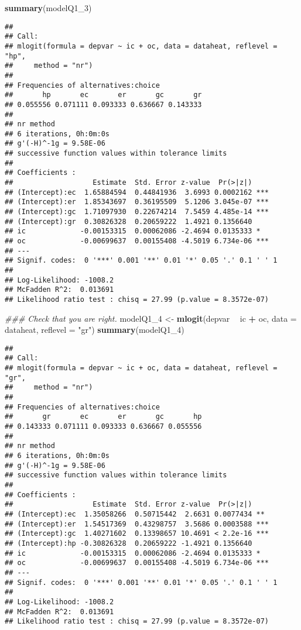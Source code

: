 \documentclass[
]{article}
\newenvironment{Shaded}{\begin{snugshade}}{\end{snugshade}}
\newcommand{\CommentTok}[1]{\textcolor[rgb]{0.56,0.35,0.01}{\textit{#1}}}
\newcommand{\DataTypeTok}[1]{\textcolor[rgb]{0.13,0.29,0.53}{#1}}
\newcommand{\DecValTok}[1]{\textcolor[rgb]{0.00,0.00,0.81}{#1}}
\newcommand{\KeywordTok}[1]{\textcolor[rgb]{0.13,0.29,0.53}{\textbf{#1}}}
\newcommand{\NormalTok}[1]{#1}
\newcommand{\OperatorTok}[1]{\textcolor[rgb]{0.81,0.36,0.00}{\textbf{#1}}}
\newcommand{\StringTok}[1]{\textcolor[rgb]{0.31,0.60,0.02}{#1}}
\begin{document}
\begin{Shaded}
\begin{Highlighting}[]
\KeywordTok{summary}\NormalTok{(modelQ1_}\DecValTok{3}\NormalTok{)}
\end{Highlighting}
\end{Shaded}

\begin{verbatim}
## 
## Call:
## mlogit(formula = depvar ~ ic + oc, data = dataheat, reflevel = "hp", 
##     method = "nr")
## 
## Frequencies of alternatives:choice
##       hp       ec       er       gc       gr 
## 0.055556 0.071111 0.093333 0.636667 0.143333 
## 
## nr method
## 6 iterations, 0h:0m:0s 
## g'(-H)^-1g = 9.58E-06 
## successive function values within tolerance limits 
## 
## Coefficients :
##                   Estimate  Std. Error z-value  Pr(>|z|)    
## (Intercept):ec  1.65884594  0.44841936  3.6993 0.0002162 ***
## (Intercept):er  1.85343697  0.36195509  5.1206 3.045e-07 ***
## (Intercept):gc  1.71097930  0.22674214  7.5459 4.485e-14 ***
## (Intercept):gr  0.30826328  0.20659222  1.4921 0.1356640    
## ic             -0.00153315  0.00062086 -2.4694 0.0135333 *  
## oc             -0.00699637  0.00155408 -4.5019 6.734e-06 ***
## ---
## Signif. codes:  0 '***' 0.001 '**' 0.01 '*' 0.05 '.' 0.1 ' ' 1
## 
## Log-Likelihood: -1008.2
## McFadden R^2:  0.013691 
## Likelihood ratio test : chisq = 27.99 (p.value = 8.3572e-07)
\end{verbatim}

\begin{Shaded}
\begin{Highlighting}[]
\CommentTok{### Check that you are right.}
\NormalTok{modelQ1_}\DecValTok{4}\NormalTok{ <-}\StringTok{ }\KeywordTok{mlogit}\NormalTok{(depvar }\OperatorTok{~}\StringTok{ }\NormalTok{ic }\OperatorTok{+}\StringTok{ }\NormalTok{oc, }\DataTypeTok{data =}\NormalTok{ dataheat, }\DataTypeTok{reflevel =} \StringTok{"gr"}\NormalTok{)}
\KeywordTok{summary}\NormalTok{(modelQ1_}\DecValTok{4}\NormalTok{)}
\end{Highlighting}
\end{Shaded}

\begin{verbatim}
## 
## Call:
## mlogit(formula = depvar ~ ic + oc, data = dataheat, reflevel = "gr", 
##     method = "nr")
## 
## Frequencies of alternatives:choice
##       gr       ec       er       gc       hp 
## 0.143333 0.071111 0.093333 0.636667 0.055556 
## 
## nr method
## 6 iterations, 0h:0m:0s 
## g'(-H)^-1g = 9.58E-06 
## successive function values within tolerance limits 
## 
## Coefficients :
##                   Estimate  Std. Error z-value  Pr(>|z|)    
## (Intercept):ec  1.35058266  0.50715442  2.6631 0.0077434 ** 
## (Intercept):er  1.54517369  0.43298757  3.5686 0.0003588 ***
## (Intercept):gc  1.40271602  0.13398657 10.4691 < 2.2e-16 ***
## (Intercept):hp -0.30826328  0.20659222 -1.4921 0.1356640    
## ic             -0.00153315  0.00062086 -2.4694 0.0135333 *  
## oc             -0.00699637  0.00155408 -4.5019 6.734e-06 ***
## ---
## Signif. codes:  0 '***' 0.001 '**' 0.01 '*' 0.05 '.' 0.1 ' ' 1
## 
## Log-Likelihood: -1008.2
## McFadden R^2:  0.013691 
## Likelihood ratio test : chisq = 27.99 (p.value = 8.3572e-07)
\end{verbatim}
\end{document}
